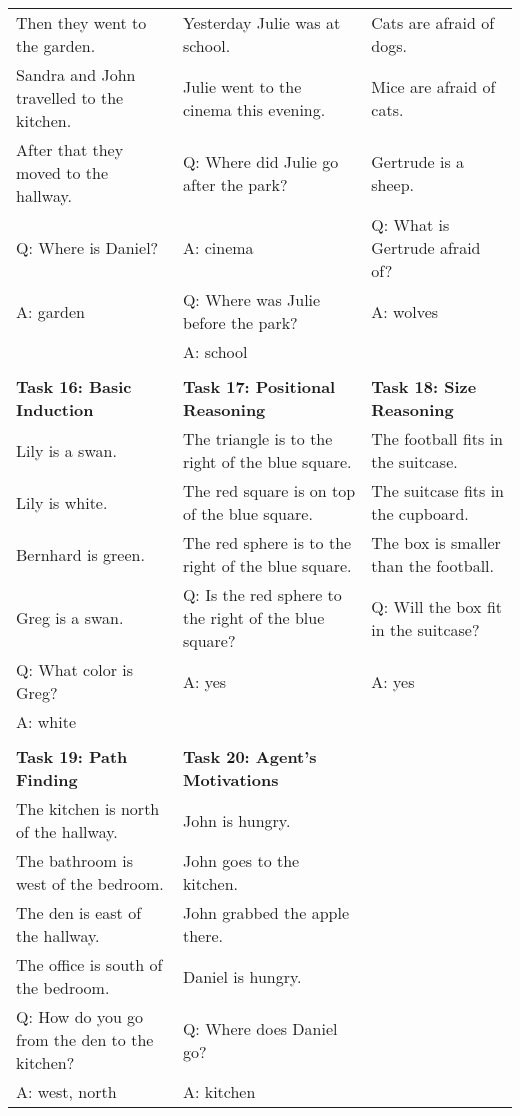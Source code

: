 \documentclass{article}
\begin{document}
\begin{table}
\begin{tabular}{@{}lll@{}}
Then they went to the garden.              & Yesterday Julie was at school.           & Cats are afraid of dogs.       \\
Sandra and John travelled to the kitchen.  & Julie went to the cinema this evening.   & Mice are afraid of cats.       \\
After that they moved to the hallway.      & Q: Where did Julie go after the park?    & Gertrude is a sheep.           \\
Q: Where is Daniel?                        & A: cinema                                & Q: What is Gertrude afraid of? \\
A: garden                                  & Q: Where was Julie before the park?      & A: wolves                      \\
                                           & A: school                                &                                \\
&&\\
\textbf{Task 16: Basic Induction}  &
\textbf{Task 17: Positional Reasoning}    &
\textbf{Task 18: Size Reasoning}    \\
\cmidrule(r){1-1} \cmidrule(lr){2-2} \cmidrule(lr){3-3}
Lily is a swan.        & The triangle is to the right of the blue square.      & The football fits in the suitcase.    \\
Lily is white.         & The red square is on top of the blue square.          & The suitcase fits in the cupboard.    \\
Bernhard is green.     & The red sphere is to the right of the blue square.    & The box is smaller than the football. \\
Greg is a swan.        & Q: Is the red sphere to the right of the blue square? & Q: Will the box fit in the suitcase?  \\
Q: What color is Greg? & A: yes                                                & A: yes                                \\
A: white               &                                                       &                                       \\
&&\\
\textbf{Task 19: Path Finding}  &
\textbf{Task 20: Agent's Motivations}    &
\\
\cmidrule(r){1-1} \cmidrule(lr){2-2}
The kitchen is north of the hallway.          & John is hungry.               & \\
The bathroom is west of the bedroom.          & John goes to the kitchen.     & \\
The den is east of the hallway.               & John grabbed the apple there. & \\
The office is south of the bedroom.           & Daniel is hungry.             & \\
Q: How do you go from the den to the kitchen? & Q: Where does Daniel go?      & \\
A: west, north                                & A: kitchen                    & \\
\end{tabular}
\label{table:sample-all-babi-tasks}
\end{table}
\end{document}
